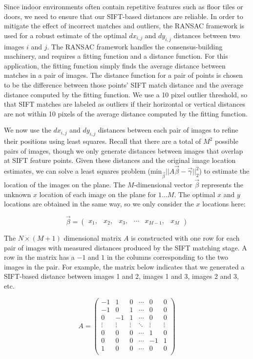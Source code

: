 \documentclass[10pt,twocolumn,letterpaper]{article}
\begin{document}
Since indoor environments often contain repetitive features such as
floor tiles or doors, we need to ensure that our SIFT-based distances
are reliable. In order to mitigate the effect of incorrect matches and
outliers, the RANSAC framework \cite{fischler1981random} is used for a
robust estimate of the optimal $dx_{i,j}$ and $dy_{i,j}$ distances
between two images $i$ and $j$. The RANSAC framework handles the
consensus-building machinery, and requires a fitting function and a
distance function. For this application, the fitting function simply
finds the average distance between matches in a pair of images. The
distance function for a pair of points is chosen to be the difference
between those points' SIFT match distance and the average distance
computed by the fitting function. We use a 10 pixel outlier
threshold, so that SIFT matches are labeled as outliers if
their horizontal or vertical distances are not within 10 pixels of the
average distance computed by the fitting function.

We now use the $dx_{i,j}$ and $dy_{i,j}$ distances between each pair
of images to refine their positions using least squares. Recall that
there are a total of $M^{2}$ possible pairs of images, though we only
generate distances between images that overlap at SIFT feature
points. Given these distances and the original image location
estimates, we can solve a least squares problem
($\textrm{min}_{\vec{\beta}} ||A \vec{\beta} - \vec{\gamma}||_2^2 $)
to estimate the location of the images on the plane. The
$M$-dimensional vector $\vec{\beta}$ represents the unknown $x$
location of each image on the plane for $1 \dots M$. The optimal $x$
and $y$ locations are obtained in the same way, so we only consider
the $x$ locations here:

\[\vec{\beta} =
\begin{pmatrix}
  x_1, & x_2, & x_3, & \cdots & x_{M-1}, & x_M
\end{pmatrix}
\]

The $N \times (M+1)$ dimensional matrix $A$ is constructed with one
row for each pair of images with measured distances produced by the
SIFT matching stage. A row in the matrix has a $-1$ and $1$ in the
columns corresponding to the two images in the pair. For example, the
matrix below indicates that we generated a SIFT-based distance between
images 1 and 2, images 1 and 3, images 2 and 3, etc.

\[
A =
\begin{pmatrix}
  -1 & 1 & 0 & \cdots & 0 & 0\\
  -1 & 0 & 1 & \cdots & 0 & 0\\
  0 & -1 & 1 & \cdots & 0 & 0\\
  \vdots  & \vdots & \vdots & \ddots & \vdots  & \vdots\\
  0 & 0 & 0 & \cdots & 1 & 0 \\
  0 & 0 & 0 & \cdots & -1 & 1 \\
  1 & 0 & 0 & \cdots & 0 & 0 \\
\end{pmatrix}
\]
\end{document}
